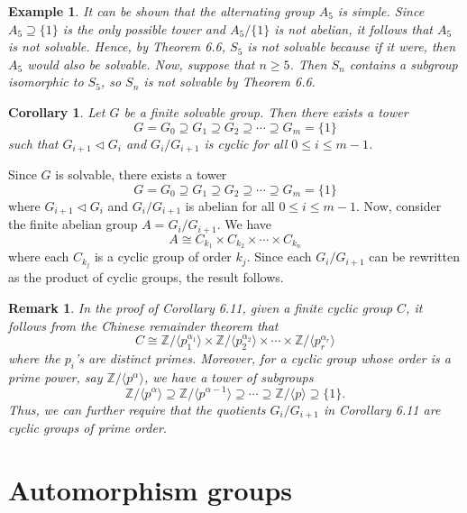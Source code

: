 \documentclass[10pt]{article}
\makeatletter
\newcommand{\Z}{\mathbb{Z}}
\newcommand{\norm}{\triangleleft}
\theoremstyle{newstyle}
\newtheorem{cor}[thm]{Corollary}
\newtheorem{remark}[thm]{Remark}
\newtheorem{exmp}[thm]{Example}
\newenvironment{pf}[1][\proofname]{\par
  \pushQED{\qed}%
  \normalfont \topsep0\p@\relax
  \trivlist
  \item[\hskip\labelsep\scshape
  #1\@addpunct{.}]\ignorespaces
}{%
  \popQED\endtrivlist\@endpefalse
}
\makeatother
\begin{document}
\begin{exmp}
It can be shown that the alternating group $A_5$ is simple. Since $A_5 \supseteq \{1\}$ is the only 
possible tower and $A_5/\{1\}$ is not abelian, it follows that $A_5$ is not solvable. 
Hence, by Theorem 6.6, $S_5$ is not solvable because if it were, then $A_5$ would 
also be solvable. Now, suppose that $n \geq 5$. Then 
$S_n$ contains a subgroup isomorphic to $S_5$, so $S_n$ is not solvable by Theorem 6.6.
\end{exmp}

\begin{cor}
Let $G$ be a finite solvable group. Then there exists a tower 
\[ G = G_0 \supseteq G_1 \supseteq G_2 \supseteq \cdots \supseteq G_m = \{1\} \]
such that $G_{i+1} \norm G_i$ and $G_i/G_{i+1}$ is cyclic for all $0 \leq i \leq m-1$. 
\end{cor}
\begin{pf}
Since $G$ is solvable, there exists a tower
\[ G = G_0 \supseteq G_1 \supseteq G_2 \supseteq \cdots \supseteq G_m = \{1\} \]
where $G_{i+1} \norm G_i$ and $G_i/G_{i+1}$ is abelian for all $0 \leq i \leq m-1$. 
Now, consider the finite abelian group $A = G_i/G_{i+1}$. We have 
\[ A \cong C_{k_1} \times C_{k_2} \times \cdots \times C_{k_n} \]
where each $C_{k_j}$ is a cyclic group of order $k_j$. Since each $G_i/G_{i+1}$ can be 
rewritten as the product of cyclic groups, the result follows.
\end{pf}

\begin{remark}
In the proof of Corollary 6.11, given a finite cyclic group $C$, it follows from the Chinese 
remainder theorem that 
\[ C \cong \Z/\langle p_1^{\alpha_1} \rangle \times \Z/\langle p_2^{\alpha_2} \rangle 
\times \cdots \times \Z/\langle p_r^{\alpha_r} \rangle \]
where the $p_i$'s are distinct primes. Moreover, for a cyclic group whose order is a prime power, 
say $\Z/\langle p^{\alpha} \rangle$, we have a tower of subgroups 
\[ \Z/\langle p^\alpha \rangle \supseteq \Z/\langle p^{\alpha-1} \rangle 
\supseteq \cdots \supseteq \Z/\langle p \rangle \supseteq \{1\}. \]
Thus, we can further require that the quotients $G_i/G_{i+1}$ in Corollary 6.11 are
cyclic groups of prime order. 
\end{remark}

\newpage 
\section{Automorphism groups}
\end{document}

